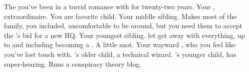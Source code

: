 \documentclass[char]{LRSguildcamp1}
\begin{document}
\begin{contacts}
	\contact{\cOS{}} The \cOS{\hero} you've been in a torrid romance with for twenty-two years.
	\contact{\cGrandma{}} Your \cGrandma{\parent}, \cGrandma{\villain} extraordinaire.  You are \cGrandma{\their} favorite child.
	\contact{\cArchitect{}} Your middle sibling.  Makes most of the family, you included, uncomfortable to be around, but you need them to accept the \cVillainCompact{\intro}'s bid for a new HQ.
	\contact{\cYoungest{}} Your youngest sibling.  \cGrandma{\Parent} let \cYoungest{\them} get away with everything, up to and including becoming a \cYoungest{\hero}.  A little snot.
	\contact{\cGrad{}} Your wayward \cGrad{\offspring}, who you feel like you've lost touch with.
	\contact{\cTeen{}} \cArchitect{}'s older child, a technical wizard.
	\contact{\cTween{}} \cArchitect{}'s younger child, has super-hearing.  Runs a conspiracy theory blog.  
\end{contacts}
\end{document}
